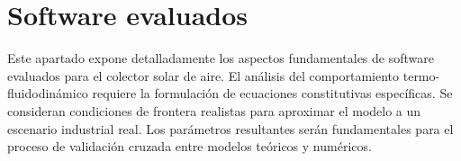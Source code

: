 \section{Software evaluados}
\label{sec:cap08_evaluados}

Este apartado expone detalladamente los aspectos fundamentales de software evaluados para el colector solar de aire.
El análisis del comportamiento termo-fluidodinámico requiere la formulación de ecuaciones constitutivas específicas.
Se consideran condiciones de frontera realistas para aproximar el modelo a un escenario industrial real.
Los parámetros resultantes serán fundamentales para el proceso de validación cruzada entre modelos teóricos y numéricos.
